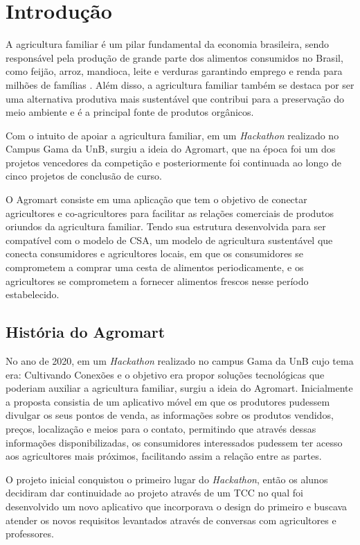 \chapter[Introdução]{Introdução}

A agricultura familiar é um pilar fundamental da economia brasileira, sendo responsável pela produção de grande parte dos alimentos consumidos no Brasil, como feijão, arroz, mandioca, leite e verduras garantindo emprego e renda para milhões de famílias \cite{embrapa2024}. Além disso, a agricultura familiar também se destaca por ser uma alternativa produtiva mais sustentável que contribui para a preservação do meio ambiente e é a principal fonte de produtos orgânicos.

Com o intuito de apoiar a agricultura familiar, em um \textit{Hackathon} realizado no Campus Gama da UnB, surgiu a ideia do Agromart, que na época foi um dos projetos vencedores da competição e posteriormente foi continuada ao longo de cinco projetos de conclusão de curso.

O Agromart consiste em uma aplicação que tem o objetivo de conectar agricultores e co-agricultores para facilitar as relações comerciais de produtos oriundos da agricultura familiar. Tendo sua estrutura desenvolvida para ser compatível com o modelo de CSA, um modelo de agricultura sustentável que conecta consumidores e agricultores locais, em que os consumidores se comprometem a comprar uma cesta de alimentos periodicamente, e os agricultores se comprometem a fornecer alimentos frescos nesse período estabelecido.

\section{História do Agromart}

No ano de 2020, em um \textit{Hackathon} realizado no campus Gama da UnB cujo tema era: Cultivando Conexões e o objetivo era propor soluções tecnológicas que poderiam auxiliar a agricultura familiar, surgiu a ideia do Agromart. Inicialmente a proposta consistia de um aplicativo móvel em que os produtores pudessem divulgar os seus pontos de venda, as informações sobre os produtos vendidos, preços, localização e meios para o contato, permitindo que através dessas informações disponibilizadas, os consumidores interessados pudessem ter acesso aos agricultores mais próximos, facilitando assim a relação entre as partes. \cite{rodriguesemacedo2021}

O projeto inicial conquistou o primeiro lugar do \textit{Hackathon}, então os alunos decidiram dar continuidade ao projeto através de um TCC no qual foi desenvolvido um novo aplicativo que incorporava o design do primeiro e buscava atender os novos requisitos levantados através de conversas com agricultores e professores. \cite{rodriguesemacedo2021}

